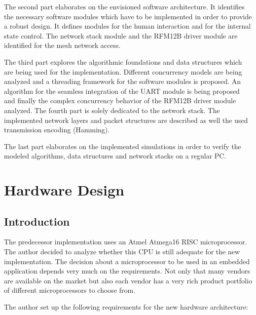 The second part elaborates on the envisioned software architecture. It identifies the necessary software modules which have to be implemented in order to provide a robust design. It defines modules for the human interaction and for the internal state control. The network stack module and the RFM12B driver module are identified for the mesh network access.

The third part explores the algorithmic foundations and data structures which are being used for the implementation. Different concurrency models are being analyzed and a threading framework for the software modules is proposed. An algorithm for the seamless integration of the UART module is being proposed and finally the complex concurrency behavior of the RFM12B driver module analyzed.
The fourth part is solely dedicated to the network stack. The implemented network layers and packet structures are described as well the used transmission encoding (Hamming).

The last part elaborates on the implemented simulations in order to verify the modeled algorithms, data structures and network stacks on a regular PC.
\chapter{Hardware Design}
\section{Introduction}
The predecessor implementation uses an Atmel Atmega16 RISC microprocessor. The author decided to analyze whether this CPU is still adequate for the new implementation. The decision about a microprocessor to be used in an embedded application depends very much on the requirements. Not only that many vendors are available on the market but also each vendor has a very rich product portfolio of different microprocessors to choose from.

The author set up the following requirements for the new hardware architecture:

